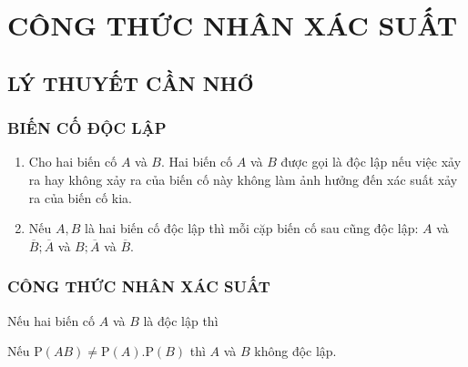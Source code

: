 \section{CÔNG THỨC NHÂN XÁC SUẤT}
\subsection{LÝ THUYẾT CẦN NHỚ}
\subsubsection{BIẾN CỐ ĐỘC LẬP}
\begin{enumerate}[\iconMT]
	\item {} Cho hai biến cố $A$ và $B$. Hai biến cố $A$ và $B$ được gọi là độc lập nếu việc xảy ra hay không xảy ra của biến cố này không làm ảnh hưởng đến xác suất xảy ra của biến cố kia.
	\item {} Nếu $A, B$ là hai biến cố độc lập thì mỗi cặp biến cố sau cũng độc lập: $A$ và $\overline{B} ; \overline{A}$ và $B ; \overline{A}$ và $\overline{B}$.
\end{enumerate}
\subsubsection{CÔNG THỨC NHÂN XÁC SUẤT}

Nếu hai biến cố $A$ và $B$ là độc lập thì 
\begin{luuy}
	Nếu $\mathrm{P}(A B)\ne \mathrm{P}(A) . \mathrm{P}(B)$ thì $A$ và $B$ không độc lập.
\end{luuy}

